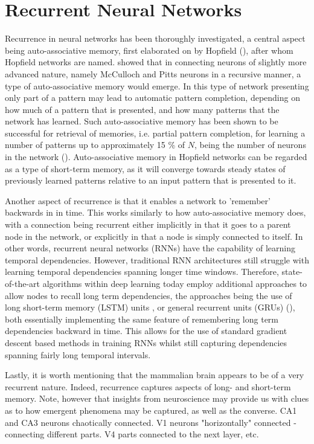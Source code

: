 \section{Recurrent Neural Networks}

Recurrence in neural networks has been thoroughly investigated, a central aspect being auto-associative memory, first elaborated on by Hopfield (\cite{Hopfield1982}), after whom Hopfield networks are named. \cite{Hopfield1982} showed that in connecting neurons of slightly more advanced nature, namely McCulloch and Pitts neurons in a recursive manner, a type of auto-associative memory would emerge. In this type of network presenting only part of a pattern may lead to automatic pattern completion, depending on how much of a pattern that is presented, and how many patterns that the network has learned. Such auto-associative memory has been shown to be successful for retrieval of memories, i.e. partial pattern completion, for learning a number of patterns up to approximately 15 \% of $N$, being the number of neurons in the network (\cite{Hopfield1982}). Auto-associative memory in Hopfield networks can be regarded as a type of short-term memory, as it will converge towards steady states of previously learned patterns relative to an input pattern that is presented to it.

Another aspect of recurrence is that it enables a network to 'remember' backwards in in time. This works similarly to how auto-associative memory does, with a connection being recurrent either implicitly in that it goes to a parent node in the network, or explicitly in that a node is simply connected to itself. In other words, recurrent neural networks (RNNs) have the capability of learning temporal dependencies. However, traditional RNN architectures still struggle with learning temporal dependencies spanning longer time windows. Therefore, state-of-the-art algorithms within deep learning today employ additional approaches to allow nodes to recall long term dependencies, the approaches being the use of long short-term memory (LSTM) units \cite{Hochreiter1997}, or general recurrent units (GRUs) (\cite{Cho2014}), both essentially implementing the same feature of remembering long term dependencies backward in time. This allows for the use of standard gradient descent based methods in training RNNs whilst still capturing dependencies spanning fairly long temporal intervals.

Lastly, it is worth mentioning that the mammalian brain appears to be of a very recurrent nature. Indeed, recurrence captures aspects of long- and short-term memory. Note, however that insights from neuroscience may provide us with clues as to how emergent phenomena may be captured, as well as the converse. CA1 and CA3 neurons chaotically connected. V1 neurons "horizontally" connected - connecting different parts. V4 parts connected to the next layer, etc.



